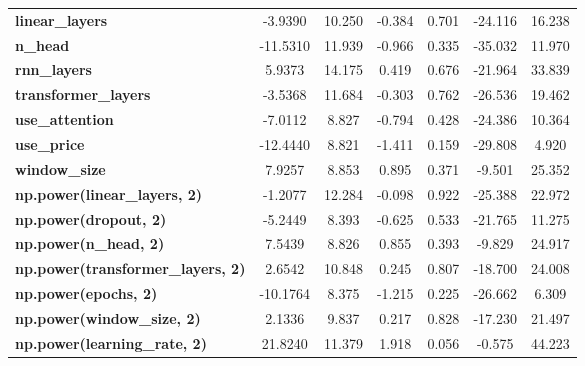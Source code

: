 \begin{center}
\begin{tabular}{lcccccc}
\textbf{linear\_layers}                   &      -3.9390  &       10.250     &    -0.384  &         0.701        &      -24.116    &       16.238     \\
\textbf{n\_head}                          &     -11.5310  &       11.939     &    -0.966  &         0.335        &      -35.032    &       11.970     \\
\textbf{rnn\_layers}                      &       5.9373  &       14.175     &     0.419  &         0.676        &      -21.964    &       33.839     \\
\textbf{transformer\_layers}              &      -3.5368  &       11.684     &    -0.303  &         0.762        &      -26.536    &       19.462     \\
\textbf{use\_attention}                   &      -7.0112  &        8.827     &    -0.794  &         0.428        &      -24.386    &       10.364     \\
\textbf{use\_price}                       &     -12.4440  &        8.821     &    -1.411  &         0.159        &      -29.808    &        4.920     \\
\textbf{window\_size}                     &       7.9257  &        8.853     &     0.895  &         0.371        &       -9.501    &       25.352     \\
\textbf{np.power(linear\_layers, 2)}      &      -1.2077  &       12.284     &    -0.098  &         0.922        &      -25.388    &       22.972     \\
\textbf{np.power(dropout, 2)}             &      -5.2449  &        8.393     &    -0.625  &         0.533        &      -21.765    &       11.275     \\
\textbf{np.power(n\_head, 2)}             &       7.5439  &        8.826     &     0.855  &         0.393        &       -9.829    &       24.917     \\
\textbf{np.power(transformer\_layers, 2)} &       2.6542  &       10.848     &     0.245  &         0.807        &      -18.700    &       24.008     \\
\textbf{np.power(epochs, 2)}              &     -10.1764  &        8.375     &    -1.215  &         0.225        &      -26.662    &        6.309     \\
\textbf{np.power(window\_size, 2)}        &       2.1336  &        9.837     &     0.217  &         0.828        &      -17.230    &       21.497     \\
\textbf{np.power(learning\_rate, 2)}      &      21.8240  &       11.379     &     1.918  &         0.056        &       -0.575    &       44.223     \\

\end{tabular}
\end{center}
